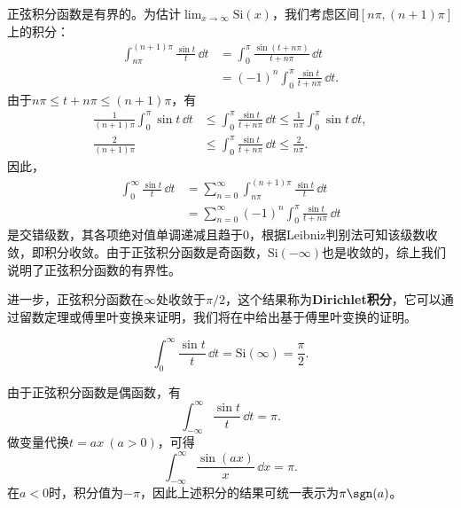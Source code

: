 正弦积分函数是有界的。为估计$\lim_{x\to\infty}\mathrm{Si}(x)$，我们考虑区间$[n\pi,(n+1)\pi]$上的积分：
\begin{align}
    \int_{n\pi}^{(n+1)\pi}\frac{\sin t}{t}\,\dd t&=\int_{0}^{\pi}\frac{\sin(t+n\pi)}{t+n\pi}\,\dd t\nonumber\\
    &=(-1)^n\int_{0}^{\pi}\frac{\sin t}{t+n\pi}\,\dd t.
\end{align}
由于$n\pi\leq t+n\pi\leq (n+1)\pi$，有
\begin{align}
    \frac{1}{(n+1)\pi}\int_{0}^{\pi}\sin t\,\dd t&\leq \int_{0}^{\pi}\frac{\sin t}{t+n\pi}\,\dd t\leq \frac{1}{n\pi}\int_{0}^{\pi}\sin t\,\dd t,\\
    \frac{2}{(n+1)\pi}&\leq \int_{0}^{\pi}\frac{\sin t}{t+n\pi}\,\dd t\leq \frac{2}{n\pi}.
\end{align}
因此，
\begin{align}
    \int_{0}^{\infty}\frac{\sin t}{t}\,\dd t&=\sum_{n=0}^{\infty}\int_{n\pi}^{(n+1)\pi}\frac{\sin t}{t}\,\dd t\nonumber\\
                                            &=\sum_{n=0}^{\infty}(-1)^n\int_{0}^{\pi}\frac{\sin t}{t+n\pi}\,\dd t
\end{align}
是交错级数，其各项绝对值单调递减且趋于0，根据Leibniz判别法可知该级数收敛，即积分收敛。由于正弦积分函数是奇函数，$\mathrm{Si}(-\infty)$也是收敛的，综上我们说明了正弦积分函数的有界性。

进一步，正弦积分函数在$\infty$处收敛于$\pi/2$，这个结果称为\textbf{Dirichlet积分}，它可以通过留数定理或傅里叶变换来证明，我们将在中给出基于傅里叶变换的证明。
\begin{theorem}[Dirichlet积分]
    \label{thm:dirichlet_int}
    \begin{equation}
        \int_{0}^{\infty}\frac{\sin t}{t}\,\dd t=\mathrm{Si}(\infty)=\frac{\pi}{2}.
    \end{equation}
\end{theorem}

\begin{corollary}
    由于正弦积分函数是偶函数，有
    \begin{equation}
        \int_{-\infty}^{\infty}\frac{\sin t}{t}\,\dd t=\pi.
    \end{equation}
    做变量代换$t=ax\ (a>0)$，可得
    \begin{equation}
        \int_{-\infty}^{\infty}\frac{\sin(ax)}{x}\,\dd x=\pi.
    \end{equation}
    在$a<0$时，积分值为$-\pi$，因此上述积分的结果可统一表示为$\pi\sgn(a)$。
\end{corollary}

